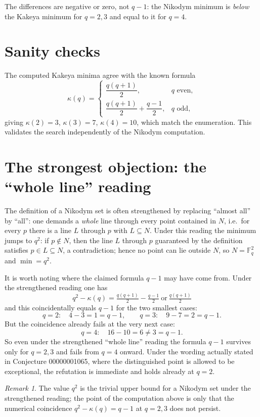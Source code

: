 \documentclass[11pt]{article}
\theoremstyle{definition}
\theoremstyle{remark}
\newtheorem{remark}{Remark}
\begin{document}
The differences are negative or zero, not $q-1$: the Nikodym minimum is
\emph{below} the Kakeya minimum for $q=2,3$ and equal to it for $q=4$.

\section{Sanity checks}

The computed Kakeya minima agree with the known formula
\[
  \kappa(q)=
  \begin{cases}
    \dfrac{q(q+1)}{2}, & q \text{ even},\\[2mm]
    \dfrac{q(q+1)}{2}+\dfrac{q-1}{2}, & q \text{ odd},
  \end{cases}
\]
giving $\kappa(2)=3$, $\kappa(3)=7$, $\kappa(4)=10$, which match the
enumeration. This validates the search independently of the Nikodym
computation.

\section{The strongest objection: the ``whole line'' reading}
\label{sec:whole-line}

The definition of a Nikodym set is often strengthened by replacing ``almost
all'' by ``all'': one demands a \emph{whole} line through every point contained
in $N$, i.e.\ for every $p$ there is a line $L$ through $p$ with
$L\subseteq N$. Under this reading the minimum jumps to $q^2$: if $p\notin N$,
then the line $L$ through $p$ guaranteed by the definition satisfies
$p\in L\subseteq N$, a contradiction; hence no point can lie outside $N$, so
$N=\mathbb{F}_q^2$ and $\min = q^2$.

It is worth noting where the claimed formula $q-1$ may have come from. Under
the strengthened reading one has
\[
  q^2-\kappa(q) = \tfrac{q(q+1)}{2} - \tfrac{q-1}{2}\ \text{or}\ \tfrac{q(q+1)}{2}
\]
and this coincidentally equals $q-1$ for the two smallest cases:
\[
  q=2:\quad 4-3=1=q-1,\qquad q=3:\quad 9-7=2=q-1 .
\]
But the coincidence already fails at the very next case:
\[
  q=4:\quad 16-10=6\neq 3=q-1 .
\]
So even under the strengthened ``whole line'' reading the formula $q-1$
survives only for $q=2,3$ and fails from $q=4$ onward. Under the wording
actually stated in Conjecture 00000001065, where the distinguished point is
allowed to be exceptional, the refutation is immediate and holds already at
$q=2$.

\begin{remark}
The value $q^2$ is the trivial upper bound for a Nikodym set under the
strengthened reading; the point of the computation above is only that the
numerical coincidence $q^2-\kappa(q)=q-1$ at $q=2,3$ does not persist.
\end{remark}
\end{document}
